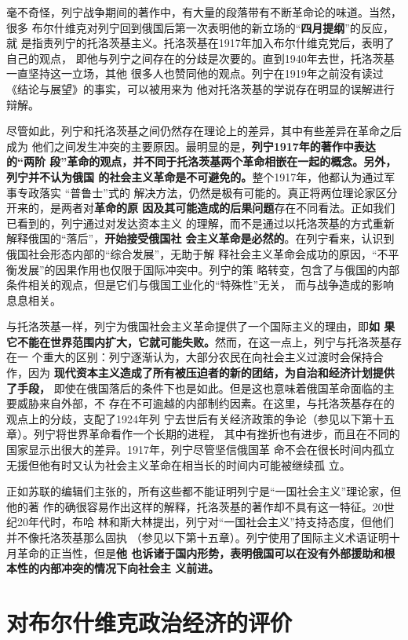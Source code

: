 毫不奇怪，列宁战争期间的著作中，有大量的段落带有不断革命论的味道。当然，很多
布尔什维克对列宁回到俄国后第一次表明他的新立场的“\textbf{四月提纲}”的反应，就
是指责列宁的托洛茨基主义。托洛茨基在1917年加入布尔什维克党后，表明了自己的观点，
即他与列宁之间存在的分歧是次要的。直到1940年去世，托洛茨基一直坚持这一立场，其他
很多人也赞同他的观点。列宁在1919年之前没有读过《结论与展望》的事实，可以被用来为
他对托洛茨基的学说存在明显的误解进行辩解。

尽管如此，列宁和托洛茨基之间仍然存在理论上的差异，其中有些差异在革命之后成为
他们之间发生冲突的主要原因。最明显的是，\textbf{列宁1917年的著作中表达的“两阶
段”革命的观点，并不同于托洛茨基两个革命相嵌在一起的概念。另外，列宁并不认为俄国
的社会主义革命是不可避免的。}整个1917年，他都认为通过军事专政落实 “普鲁士”式的
解决方法，仍然是极有可能的。真正将两位理论家区分开来的，是两者对\textbf{革命的原
因及其可能造成的后果问题}存在不同看法。正如我们已看到的，列宁通过对发达资本主义
的理解，而不是通过以托洛茨基的方式重新解释俄国的“落后”，\textbf{开始接受俄国社
会主义革命是必然的}。在列宁看来，认识到俄国社会形态内部的“综合发展”，无助于解
释社会主义革命会成功的原因，“不平衡发展”的因果作用也仅限于国际冲突中。列宁的策
略转变，包含了与俄国的内部条件相关的观点，但是它们与俄国工业化的“特殊性”无关，
而与战争造成的影响息息相关。

与托洛茨基一样，列宁为俄国社会主义革命提供了一个国际主义的理由，即\textbf{如
果它不能在世界范围内扩大，它就可能失败。}然而，在这一点上，列宁与托洛茨基存在一
个重大的区别：列宁逐渐认为，大部分农民在向社会主义过渡时会保持合作，因为
\textbf{现代资本主义造成了所有被压迫者的新的团结，为自治和经济计划提供了手段，}
即使在俄国落后的条件下也是如此。但是这也意味着俄国革命面临的主要威胁来自外部，不
存在不可逾越的内部制约因素。在这里，与托洛茨基存在的观点上的分歧，支配了1924年列
宁去世后有关经济政策的争论（参见以下第十五章）。列宁将世界革命看作一个长期的进程，
其中有挫折也有进步，而且在不同的国家显示出很大的差异。1917年，列宁尽管坚信俄国革
命不会在很长时间内孤立无援但他有时又认为社会主义革命在相当长的时间内可能被继续孤
立。

正如苏联的编辑们主张的，所有这些都不能证明列宁是“一国社会主义”理论家，但他的著
作的确很容易作出这样的解释，托洛茨基的著作却不具有这一特征。20世纪20年代时，布哈
林和斯大林提出，列宁对“一国社会主义”持支持态度，但他们并不像托洛茨基那么固执
（参见以下第十五章）。列宁使用了国际主义术语证明十月革命的正当性，但是\textbf{他
  也诉诸于国内形势，表明俄国可以在没有外部援助和根本性的内部冲突的情况下向社会主
  义前进。}

\section{对布尔什维克政治经济的评价}

